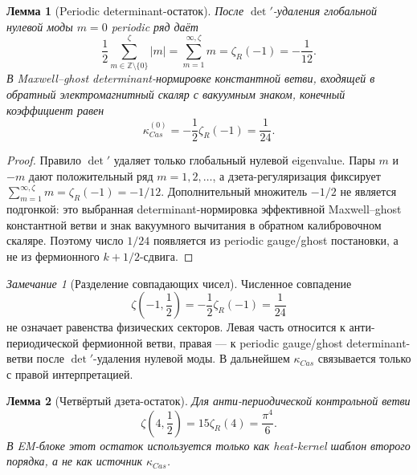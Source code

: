 \documentclass[12pt,a4paper]{report}
\newtheorem{lemma}{Лемма}[chapter]
\theoremstyle{remark}
\newtheorem{remark}{Замечание}[chapter]
\begin{document}
\begin{lemma}[Periodic determinant-остаток]
После \(\det'\)-удаления глобальной нулевой моды \(m=0\) periodic ряд даёт
\begin{equation}
    \frac12\sum_{m\in\mathbb{Z}\setminus\{0\}}^{\zeta}|m|
    =\sum_{m=1}^{\infty,\zeta}m
    =\zeta_R(-1)
    =-\frac{1}{12}.
\end{equation}
В Maxwell--ghost determinant-нормировке константной ветви, входящей в обратный электромагнитный скаляр с вакуумным знаком, конечный коэффициент равен
\begin{equation}
    \kappa_{Cas}^{(0)}=-\frac12\zeta_R(-1)=\frac{1}{24}.
\end{equation}
\end{lemma}

\begin{proof}
Правило \(\det'\) удаляет только глобальный нулевой eigenvalue. Пары \(m\) и \(-m\) дают положительный ряд \(m=1,2,\ldots\), а дзета-регуляризация фиксирует \(\sum_{m=1}^{\infty,\zeta}m=\zeta_R(-1)=-1/12\). Дополнительный множитель \(-1/2\) не является подгонкой: это выбранная determinant-нормировка эффективной Maxwell--ghost константной ветви и знак вакуумного вычитания в обратном калибровочном скаляре. Поэтому число \(1/24\) появляется из periodic gauge/ghost постановки, а не из фермионного \(k+1/2\)-сдвига.
\end{proof}

\begin{remark}[Разделение совпадающих чисел]
Численное совпадение
\begin{equation}
    \zeta\left(-1,\frac12\right)=-\frac12\zeta_R(-1)=\frac{1}{24}
\end{equation}
не означает равенства физических секторов. Левая часть относится к анти-периодической фермионной ветви, правая --- к periodic gauge/ghost determinant-ветви после \(\det'\)-удаления нулевой моды. В дальнейшем \(\kappa_{Cas}\) связывается только с правой интерпретацией.
\end{remark}

\begin{lemma}[Четвёртый дзета-остаток]
Для анти-периодической контрольной ветви
\begin{equation}
    \zeta\left(4,\frac12\right)=15\zeta_R(4)=\frac{\pi^4}{6}.
\end{equation}
В EM-блоке этот остаток используется только как heat-kernel шаблон второго порядка, а не как источник \(\kappa_{Cas}\).
\end{lemma}
\end{document}
